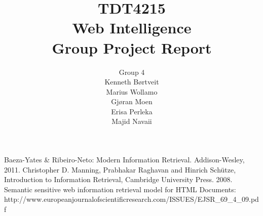\documentclass[a4paper, 11pt]{report}
\title{TDT4215 \\ Web Intelligence \\ Group Project Report}
\author{\Huge{Group 4} \vspace{2mm} \\ Kenneth Børtveit \\ Marius Wollamo \\ Gjøran Moen \\ Erisa Perleka \\ Majid Navaii}
\begin{document}
\maketitle
\tableofcontents
\listoffigures










\begin{thebibliography}{10}
Baeza-Yates \& Ribeiro-Neto: Modern Information Retrieval. Addison-Wesley, 2011.
Christopher D. Manning, Prabhakar Raghavan and Hinrich Schütze, Introduction to Information Retrieval, Cambridge University Press. 2008.
Semantic sensitive web information retrieval model for HTML Documents: http://www.europeanjournalofscientificresearch.com/ISSUES/EJSR\_69\_4\_09.pdf
\end{thebibliography}
\end{document}
